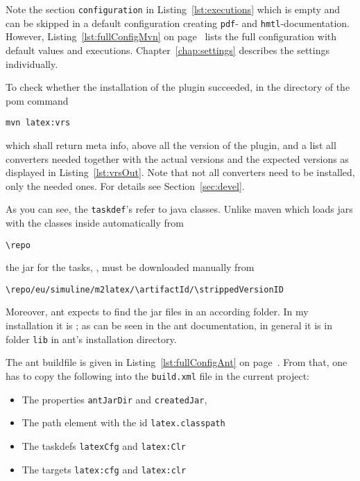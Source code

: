 Note the section \texttt{configuration} in Listing~\ref{lst:executions}
which is empty and can be skipped in a default configuration
creating \texttt{pdf}- and \texttt{hmtl}-documentation.
However, Listing~\ref{lst:fullConfigMvn} on page~\pageref{lst:fullConfigMvn}
lists the full configuration with default values
and executions.
Chapter~\ref{chap:settings} describes the settings individually.

To check whether the installation of the plugin succeeded,
in the directory of the pom command
%
\begin{Verbatim}
mvn latex:vrs
\end{Verbatim}
%
which shall return meta info, above all the version of the plugin,
and a list all converters needed
together with the actual versions and the expected versions
as displayed in Listing~\ref{lst:vrsOut}.
Note that not all converters need to be installed, only the needed ones.
For details see Section~\ref{sec:devel}.
\medskip


As you can see, the \texttt{taskdef}'s refer to java classes.
Unlike maven which loads jars with the classes inside automatically
from
% 
\begin{Verbatim}[fontsize=\small, commandchars=\\\{\}]
\repo
\end{Verbatim}
%
the jar for the tasks, \createdJar,
must be downloaded manually from
%
\begin{Verbatim}[fontsize=\scriptsize, commandchars=\\\{\}]
\repo/eu/simuline/m2latex/\artifactId/\strippedVersionID
\end{Verbatim}
%
Moreover, ant expects to find the jar files in an according folder.
In my installation it is \antJarDir;
as can be seen in the ant documentation,
in general it is in folder \texttt{lib} in ant's installation directory. 

The ant buildfile is given in Listing~\ref{lst:fullConfigAnt}
on page~\pageref{lst:fullConfigAnt}.
From that, one has to copy the following
into the \texttt{build.xml} file in the current project:
%
\begin{itemize}
\item The properties \texttt{antJarDir} and \texttt{createdJar}, 
\item The path element with the id \texttt{latex.classpath}
\item The taskdefs \texttt{latexCfg}  and \texttt{latex:Clr}
\item The  targets \texttt{latex:cfg} and \texttt{latex:clr}
\end{itemize}

